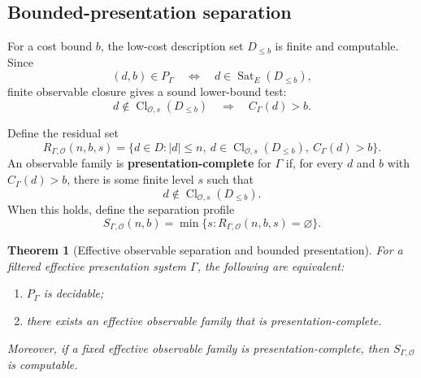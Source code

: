 \documentclass[11pt]{article}
\newtheorem{theorem}{Theorem}[section]
\theoremstyle{definition}
\theoremstyle{remark}
\begin{document}
\subsection{Bounded-presentation separation}

For a cost bound \(b\), the low-cost description set \(D_{\leq b}\) is finite and computable.  Since
\[
(d,b)\in P_\Gamma
\quad\Longleftrightarrow\quad
d\in\operatorname{Sat}_E(D_{\leq b}),
\]
finite observable closure gives a sound lower-bound test:
\[
d\notin\operatorname{Cl}_{\mathcal O,s}(D_{\leq b})
\quad\Longrightarrow\quad
C_\Gamma(d)>b.
\]

Define the residual set
\[
R_{\Gamma,\mathcal O}(n,b,s)
=
\{d\in D: |d|\leq n,\ d\in\operatorname{Cl}_{\mathcal O,s}(D_{\leq b}),\ C_\Gamma(d)>b\}.
\]
An observable family is \textbf{presentation-complete} for \(\Gamma\) if, for every \(d\) and \(b\) with \(C_\Gamma(d)>b\), there is some finite level \(s\) such that
\[
d\notin\operatorname{Cl}_{\mathcal O,s}(D_{\leq b}).
\]
When this holds, define the separation profile
\[
S_{\Gamma,\mathcal O}(n,b)
=
\min\{s:R_{\Gamma,\mathcal O}(n,b,s)=\varnothing\}.
\]

\begin{theorem}[Effective observable separation and bounded presentation]
For a filtered effective presentation system \(\Gamma\), the following are equivalent:
\begin{enumerate}[label=(\roman*)]
\item \(P_\Gamma\) is decidable;
\item there exists an effective observable family that is presentation-complete.
\end{enumerate}
Moreover, if a fixed effective observable family is presentation-complete, then \(S_{\Gamma,\mathcal O}\) is computable.
\end{theorem}
\end{document}
